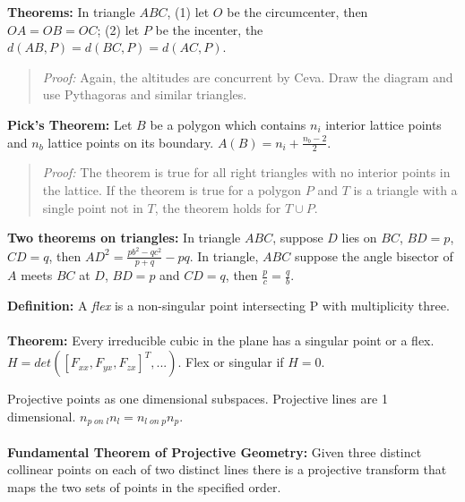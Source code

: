 {\bf Theorems:}  In triangle $ABC$, (1) let $O$ be the circumcenter, then $OA = OB = OC$;
(2) let $P$ be the incenter, the $d(AB, P) = d(BC, P) = d(AC, P)$.
\begin{quote}
\emph{Proof:}
Again, the altitudes are concurrent by Ceva.  Draw the diagram and use Pythagoras and similar triangles.
\end{quote}
{\bf Pick's Theorem:}  Let $B$ be a polygon which contains
$n_i$ interior lattice points and
$n_b$ lattice points on its boundary. $A(B)= n_i+{\frac {n_b-2} 2}$.
\begin{quote}
\emph{Proof:}
The theorem is true for all right triangles with no interior points in the lattice. 
If the theorem is true for a polygon $P$ and $T$ is a triangle with a single point not in $T$,
the theorem holds for $T \cup P$.
\end{quote}
{\bf Two theorems on triangles:} In triangle $ABC$, suppose $D$ lies on $BC$, $BD=p$,
$CD=q$, then $AD^2= {\frac {pb^2-qc^2} {p+q}} - pq$.  In triangle, $ABC$ suppose the
angle bisector of $A$ meets $BC$ at $D$, $BD=p$ and $CD=q$, then ${\frac {p}{c}}= {\frac {q}{b}}$.
\begin{quote}
\end{quote}
{\bf Definition:}
A \emph{flex} is a non-singular point intersecting P with multiplicity three.  
\\
\\
{\bf Theorem:}  Every irreducible cubic
in the plane has a singular point or a flex.  $H= det([F_{xx}, F_{yx}, F_{zx}]^T, ...)$.
Flex or singular if $H=0$.
\begin{quote}
\end{quote}
Projective points as one dimensional subspaces.  Projective lines are 1 dimensional.
$n_{p \; on \; l} n_l= n_{l \; on \; p} n_p$.
\\
\\
{\bf Fundamental Theorem of Projective Geometry:}  Given three distinct collinear points on each of 
two distinct lines there is a projective transform 
that maps the two sets of points in the specified order.
